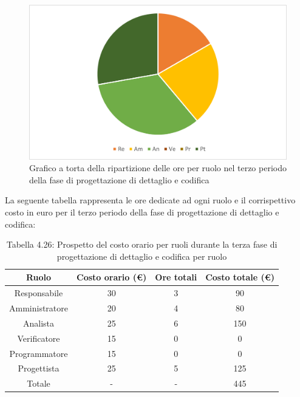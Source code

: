 \begin{figure}[H]
    \centering
    \includegraphics[scale=0.6]{img/grafi preventivo/torta/codifica/periodo3.png}
    \caption{Grafico a torta della ripartizione delle ore per ruolo nel terzo periodo della fase di progettazione di dettaglio e codifica}
\end{figure}
La seguente tabella rappresenta le ore dedicate ad ogni ruolo e il corrispettivo costo in euro per il terzo periodo della fase di progettazione di dettaglio e codifica:
\begin{table}[h]
	\setlength\extrarowheight{5pt}
	\centering
	\begin{tabularx}{\textwidth}{|ccc|c|}
		\hline
		\rowcolor{white}
		\textbf{Ruolo} & \textbf{Costo orario (€)} & \textbf{Ore totali} & \textbf{Costo totale (€)} \\
		\hline
		Responsabile &30&3&90 \\
		Amministratore &20&4&80 \\
		Analista &25&6&150 \\
		Verificatore &15&0&0 \\
		Programmatore &15&0&0 \\
		Progettista &25&5&125 \\
		\hline
		Totale &-&-&445 \\
		\hline
	\end{tabularx}
    \vspace{10pt}
	\caption{Tabella 4.26: Prospetto del costo orario per ruoli durante la terza fase di progettazione di dettaglio e codifica per ruolo}
\end{table}
%
\newpage
